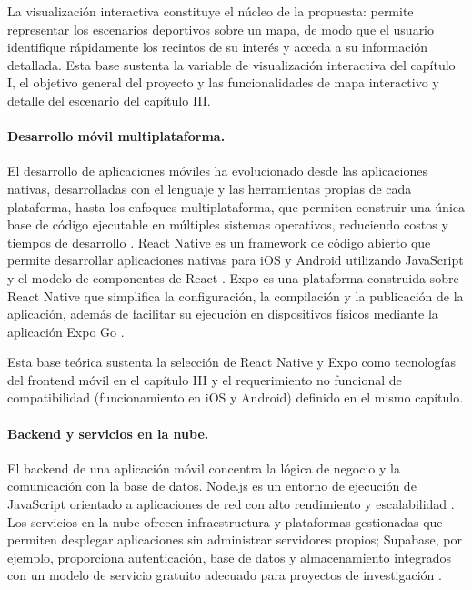 La visualizaci\'on interactiva constituye el n\'ucleo de la propuesta: permite
representar los escenarios deportivos sobre un mapa, de modo que el usuario
identifique r\'apidamente los recintos de su inter\'es y acceda a su informaci\'on
detallada. Esta base sustenta la variable de visualizaci\'on interactiva del
cap\'itulo I, el objetivo general del proyecto y las funcionalidades de mapa
interactivo y detalle del escenario del cap\'itulo III.

\paragraph{Desarrollo m\'ovil multiplataforma.} El desarrollo de aplicaciones
m\'oviles ha evolucionado desde las aplicaciones nativas, desarrolladas con el
lenguaje y las herramientas propias de cada plataforma, hasta los enfoques
multiplataforma, que permiten construir una \'unica base de c\'odigo ejecutable
en m\'ultiples sistemas operativos, reduciendo costos y tiempos de desarrollo
\citep{pressman2010}. React Native es un framework de c\'odigo abierto que
permite desarrollar aplicaciones nativas para iOS y Android utilizando
JavaScript y el modelo de componentes de React \citep{reactnative}. Expo es
una plataforma construida sobre React Native que simplifica la configuraci\'on,
la compilaci\'on y la publicaci\'on de la aplicaci\'on, adem\'as de facilitar su
ejecuci\'on en dispositivos f\'isicos mediante la aplicaci\'on Expo Go
\citep{expo}.

Esta base te\'orica sustenta la selecci\'on de React Native y Expo como
tecnolog\'ias del frontend m\'ovil en el cap\'itulo III y el requerimiento no
funcional de compatibilidad (funcionamiento en iOS y Android) definido en el
mismo cap\'itulo.

\paragraph{Backend y servicios en la nube.} El backend de una aplicaci\'on
m\'ovil concentra la l\'ogica de negocio y la comunicaci\'on con la base de
datos. Node.js es un entorno de ejecuci\'on de JavaScript orientado a
aplicaciones de red con alto rendimiento y escalabilidad \citep{nodejs}. Los
servicios en la nube ofrecen infraestructura y plataformas gestionadas que
permiten desplegar aplicaciones sin administrar servidores propios; Supabase,
por ejemplo, proporciona autenticaci\'on, base de datos y almacenamiento
integrados con un modelo de servicio gratuito adecuado para proyectos de
investigaci\'on \citep{supabase}.

